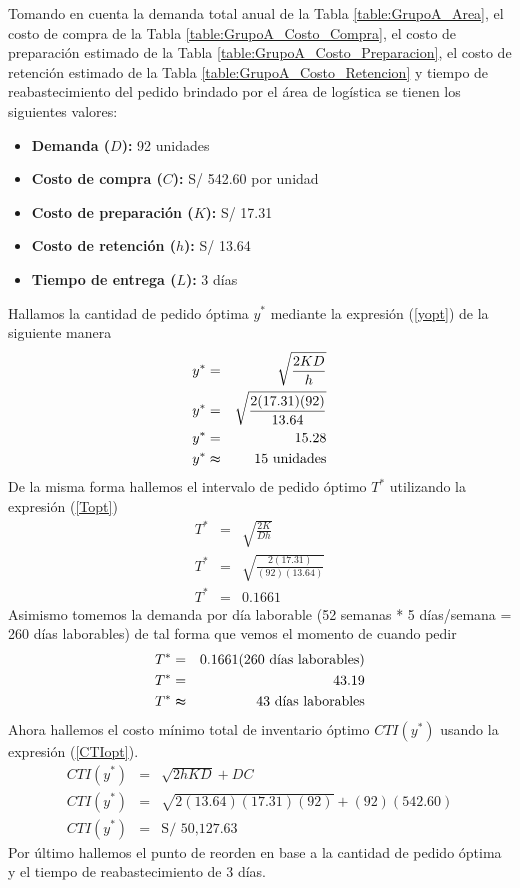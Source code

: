 Tomando en cuenta la demanda total anual de la Tabla \ref{table:GrupoA_Area}, el costo de compra de la Tabla \ref{table:GrupoA_Costo_Compra}, el costo de preparación estimado de la Tabla \ref{table:GrupoA_Costo_Preparacion}, el costo de retención estimado de la Tabla \ref{table:GrupoA_Costo_Retencion} y tiempo de reabastecimiento del pedido brindado por el área de logística se tienen los siguientes valores:

\begin{itemize}
    \item \textbf{Demanda ($D$):} 92 unidades
    \item \textbf{Costo de compra ($C$):} S/ 542.60 por unidad
    \item \textbf{Costo de preparación ($K$):} S/ 17.31
    \item \textbf{Costo de retención ($h$):} S/ 13.64
    \item \textbf{Tiempo de entrega ($L$):} 3 días
\end{itemize}

Hallamos la cantidad de pedido óptima $y^*$ mediante la expresión (\ref{yopt}) de la siguiente manera
\begin{eqnarray}
    y^* &=& \sqrt{\frac{2KD}{h}} \nonumber \\
    y^* &=& \sqrt{\frac{2(17.31)(92)}{13.64}} \nonumber \\
    y^* &=& 15.28 \nonumber \\
    y^* &\thickapprox& 15 \text{ unidades} \nonumber
\end{eqnarray}
De la misma forma hallemos el intervalo de pedido óptimo $T^*$ utilizando la expresión (\ref{Topt}) 
\begin{eqnarray}
    T^* &=& \sqrt{\frac{2K}{Dh}} \nonumber \\
    T^* &=& \sqrt{\frac{2(17.31)}{(92)(13.64)}} \nonumber \\
    T^* &=& 0.1661 \nonumber
\end{eqnarray}
Asimismo tomemos la demanda por día laborable (52 semanas * 5 días/semana = 260 días laborables) de tal forma que vemos el momento de cuando pedir
\begin{eqnarray}
    T^* &=& 0.1661 (260 \text{ días laborables}) \nonumber \\   
    T^* &=& 43.19 \nonumber \\
    T^* &\thickapprox& 43 \text{ días laborables} \nonumber
\end{eqnarray}
Ahora hallemos el costo mínimo total de inventario óptimo $CTI(y^*)$ usando la expresión (\ref{CTIopt}).
\begin{eqnarray}
    CTI(y^*) &=& \sqrt{2hKD} + DC \nonumber \\
    CTI(y^*) &=& \sqrt{2(13.64)(17.31)(92)} + (92)(542.60) \nonumber \\
    CTI(y^*) &=& \text{S/ 50,127.63} \nonumber
\end{eqnarray}
Por último hallemos el punto de reorden en base a la cantidad de pedido óptima y el tiempo de reabastecimiento de 3 días.

